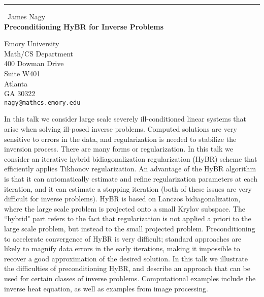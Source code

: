 \documentclass{report}
\begin{document}
\begin{center}
\rule{6in}{1pt} \
{\large James Nagy \\
{\bf Preconditioning HyBR for Inverse Problems}}

Emory University \\ Math/CS Department \\ 400 Dowman Drive \\ Suite W401 \\ Atlanta \\ GA 30322
\\
{\tt nagy@mathcs.emory.edu}\end{center}

In this talk we consider large scale severely ill-conditioned linear
systems that arise when solving ill-posed inverse problems. Computed
solutions are very sensitive to errors in the data, and regularization
is needed to stabilize the inversion process. There are many forms or
regularization. In this talk we consider an iterative hybrid
bidiagonalization regularization (HyBR) scheme that efficiently
applies Tikhonov regularization. An advantage of the HyBR algorithm
is that it can automatically estimate and refine regularization
parameters at each iteration, and it can estimate a stopping iteration
(both of these issues are very difficult for inverse problems). HyBR
is based on Lanczos bidiagonalization, where the large scale problem
is projected onto a small Krylov subspace. The ``hybrid" part refers
to the fact that regularization is not applied a priori to the large
scale problem, but instead to the small projected problem.
Preconditioning to accelerate convergence of HyBR is very difficult;
standard approaches are likely to magnify data errors in the early
iterations, making it impossible to recover a good approximation of
the desired solution. In this talk we illustrate the difficulties of
preconditioning HyBR, and describe an approach that can be used for
certain classes of inverse problems. Computational examples include
the inverse heat equation, as well as examples from image processing.
\end{document}
